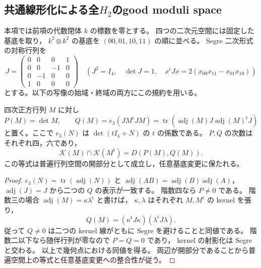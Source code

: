 
\subsection{共通線形化による全\texorpdfstring{$H_2$}{H2}のgood moduli space}
\label{subsec:qa-global-h2-good-moduli}

本項では前項の代数閉体 $k$ の標数を零とする。
四つの二次元空間には固定した基底を取り，
$k^2\otimes k^2$ の基底を $(00,01,10,11)$ の順に並べる。
Segre 二次形式の対称行列を
\[
 J=\begin{pmatrix}
 0&0&0&1\\
 0&0&-1&0\\
 0&-1&0&0\\
 1&0&0&0
 \end{pmatrix}
 \quad\left(J^2=I_4,\quad\det J=1,\quad
 x^{\mathrm{t}}Jx=2(x_{00}x_{11}-x_{01}x_{10})\right)
\]
とする。以下の写像の始域・終域の両方にこの規約を用いる。

\begin{lemma}[左右kernel条件をまとめる二つの式]
\label{lem:qa-segre-kernel-two-semi-invariants}
四次正方行列 $M$ に対し
\[
 P(M)=\det M,\qquad
 Q(M)=e_3(JM^{\mathrm{t}}JM)
      =\operatorname{tr}\!\left(
           \operatorname{adj}(M)J\operatorname{adj}(M)^{\mathrm{t}}J
        \right)
\]
と置く。ここで $e_3(N)$ は
$\det(tI_4+N)$ の $t$ の係数である。
$P,Q$ の次数はそれぞれ四，六であり，
\[
 \mathcal K(M)\cap\mathcal K(M^{\mathrm{t}})=D(P(M),Q(M)).
 \tag{PQ}\label{eq:qa-cross-pair-two-polynomials}
\]
この等式は普遍行列空間の開部分として成立し，任意基底変更に保たれる。
\end{lemma}
\begin{proof}
$e_3(N)=\operatorname{tr}(\operatorname{adj}(N))$ と
$\operatorname{adj}(AB)=\operatorname{adj}(B)\operatorname{adj}(A)$，
$\operatorname{adj}(J)=J$ から二つの $Q$ の表示が一致する。
階数四なら $P\ne0$ である。
階数三の場合
$\operatorname{adj}(M)=\kappa\lambda^{\mathrm{t}}$ と書けば，
$\kappa,\lambda$ はそれぞれ $M,M^{\mathrm{t}}$ の kernel を張り，
\[
 Q(M)=(\kappa^{\mathrm{t}}J\kappa)(\lambda^{\mathrm{t}}J\lambda).
\]
従って $Q\ne0$ は二つの kernel 線がともに Segre を避けることと同値である。
階数二以下なら随伴行列が零なので $P=Q=0$ であり，
kernel の射影化は Segre と交わる。
以上で幾何点における同値を得る。
両辺が開部分であることから普遍空間上の等式と任意基底変更への整合性が従う。
\end{proof}

